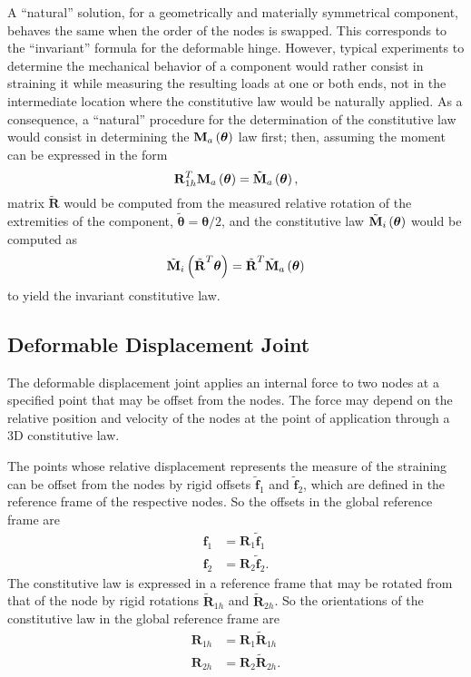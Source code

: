 \documentclass[10pt,dvips,fleqn,subeqn]{report}
\newcommand{\T}[1]{\bm{\mathbf{#1}}}
\begin{document}
A ``natural'' solution, for a geometrically and materially symmetrical
component, behaves the same when the order of the nodes is swapped.
This corresponds to the ``invariant'' formula for the deformable hinge.
However, typical experiments to determine the mechanical behavior
of a component would rather consist in straining it while measuring
the resulting loads at one or both ends, not in the intermediate
location where the constitutive law would be naturally applied.
As a consequence, a ``natural'' procedure for the determination
of the constitutive law would consist in determining 
the $\T{M}_a\plbr{\T{\theta}}$ law first; 
then, assuming the moment can be expressed in the form
\begin{equation}
	\T{R}_{1h}^T \T{M}_a\plbr{\T{\theta}}
		= \tilde{\T{M}}_a\plbr{\T{\theta}} ,
\end{equation}
matrix $\tilde{\T{R}}$ would be computed
from the measured relative rotation of the extremities of the component,
$\tilde{\T{\theta}}=\T{\theta}/2$,
and the constitutive law $\tilde{\T{M}}_i\plbr{\T{\theta}}$ 
would be computed as
\begin{equation}
	\tilde{\T{M}}_i\plbr{\tilde{\T{R}}^T \T{\theta}}
		= \tilde{\T{R}}^T \tilde{\T{M}}_a\plbr{\T{\theta}}
\end{equation}
to yield the invariant constitutive law.




\subsection{Deformable Displacement Joint}
\label{sec:constraints:deformable:deformable displacement joint}
The deformable displacement joint applies an internal force to two nodes
at a specified point that may be offset from the nodes.
The force may depend on the relative position and velocity of the nodes
at the point of application through a 3D constitutive law.

The points whose relative displacement represents the measure 
of the straining can be offset from the nodes by rigid offsets
$\tilde{\T{f}}_1$ and $\tilde{\T{f}}_2$, which are defined
in the reference frame of the respective nodes.
So the offsets in the global reference frame are
\begin{subequations}
\begin{align}
	\T{f}_1 &= \T{R}_1 \tilde{\T{f}}_1 \\
	\T{f}_2 &= \T{R}_2 \tilde{\T{f}}_2 .
\end{align}
\end{subequations}
The constitutive law is expressed in a reference frame that may be rotated
from that of the node by rigid rotations $\tilde{\T{R}}_{1h}$
and $\tilde{\T{R}}_{2h}$.
So the orientations of the constitutive law in the global reference frame are
\begin{subequations}
\begin{align}
	\T{R}_{1h} &= \T{R}_1 \tilde{\T{R}}_{1h} \\
	\T{R}_{2h} &= \T{R}_2 \tilde{\T{R}}_{2h} .
\end{align}
\end{subequations}
\end{document}
